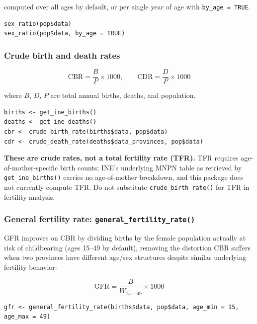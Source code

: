 \documentclass[11pt]{article}
\newcommand{\fn}[1]{\texttt{#1}}
\begin{document}
computed over all ages by default, or per single year of age with
\fn{by\_age = TRUE}.

\begin{lstlisting}
sex_ratio(pop$data)
sex_ratio(pop$data, by_age = TRUE)
\end{lstlisting}

\subsubsection{Crude birth and death rates}

\begin{equation}
\mathrm{CBR} = \frac{B}{P}\times 1000, \qquad
\mathrm{CDR} = \frac{D}{P}\times 1000
\end{equation}

where $B$, $D$, $P$ are total annual births, deaths, and population.

\begin{lstlisting}
births <- get_ine_births()
deaths <- get_ine_deaths()
cbr <- crude_birth_rate(births$data, pop$data)
cdr <- crude_death_rate(deaths$data_provinces, pop$data)
\end{lstlisting}

\textbf{These are crude rates, not a total fertility rate (TFR).} TFR
requires age-of-mother-specific birth counts; INE's underlying MNPN table as
retrieved by \fn{get\_ine\_births()} carries no age-of-mother breakdown, and
this package does not currently compute TFR. Do not substitute
\fn{crude\_birth\_rate()} for TFR in fertility analysis.

\subsubsection{General fertility rate: \fn{general\_fertility\_rate()}}

GFR improves on CBR by dividing births by the female population actually at
risk of childbearing (ages 15--49 by default), removing the distortion CBR
suffers when two provinces have different age/sex structures despite
similar underlying fertility behavior:

\begin{equation}
\mathrm{GFR} = \frac{B}{W_{15-49}} \times 1000
\end{equation}

\begin{lstlisting}
gfr <- general_fertility_rate(births$data, pop$data, age_min = 15, age_max = 49)
\end{lstlisting}
\end{document}
